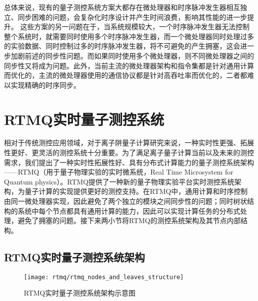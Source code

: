 总体来说，现有的量子测控系统方案大都存在微处理器和时序脉冲发生器相互独立、同步困难的问题，会复杂化时序设计并产生时间浪费，影响其性能的进一步提升。
这些方案的另一问题在于，当系统规模较大，一个时序脉冲发生器无法控制整个系统时，就需要同时使用多个时序脉冲发生器，而一个微处理器同时处理过多的实验数据、同时控制过多的时序脉冲发生器，将不可避免的产生拥塞，这会进一步加剧前述的同步性问题。而如果同时使用多个微处理器，则不同微处理器之间的同步性又将成为问题。此外，当前主流的微处理器架构和指令集都是针对通用计算而优化的，主流的微处理器使用的通信协议都是针对高吞吐率而优化的，二者都难以实现精确的时序同步。




\section[RTMQ实时量子测控系统]{RTMQ实时量子测控系统\label{section:rtmq_structure}}

相对于传统测控应用领域，对于离子阱量子计算研究来说，一种实时性更强、拓展性更好、更灵活的测控系统十分重要。为了满足离子量子计算当前以及未来的测控需求，我们提出了一种实时性拓展性好、具有分布式计算能力的量子测控系统架构——RTMQ（用于量子物理实验的实时微系统，Real Time Microsystem for Quantum physics）。RTMQ提供了一种新的量子物理实验平台实时测控系统架构，为量子计算的实现提供更好的测控支持。在RTMQ中，通用计算和时序控制由同一微处理器实现，因此避免了两个独立的模块之间同步性的问题；同时树状结构的系统中每个节点都具有通用计算的能力，因此可以实现计算任务的分布式处理，避免了拥塞的问题\cite[]{junhua01}。接下来两小节将RTMQ的测控系统架构及其节点内部结构。


\subsection[RTMQ实时量子测控系统架构]{RTMQ实时量子测控系统架构}

\begin{figure}
    \centering
    \caption[RTMQ实时量子测控系统架构示意图]{RTMQ实时量子测控系统架构示意图\label{fig:rtmq_nodes_and_leaves_structure}}
    \texttt{[image: rtmq/rtmq\_nodes\_and\_leaves\_structure]}
\end{figure}

